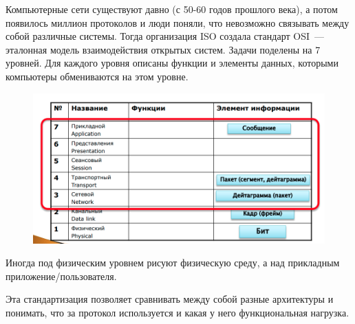 

Компьютерные сети существуют давно (с 50-60 годов прошлого века), а потом появилось миллион протоколов и люди поняли, что невозможно связывать между собой различные системы. Тогда организация ISO создала стандарт OSI~--- эталонная модель взаимодействия открытых систем. Задачи поделены на 7 уровней. Для каждого уровня описаны функции и элементы данных, которыми компьютеры обмениваются на этом уровне.

\begin{figure}[H]
  \centering
  \includegraphics[width=15cm]{images/00/01}
\end{figure}

Иногда под физическим уровнем рисуют физическую среду, а над прикладным приложение/пользователя.

Эта стандартизация позволяет сравнивать между собой разные архитектуры и понимать, что за протокол используется и какая у него функциональная нагрузка.

